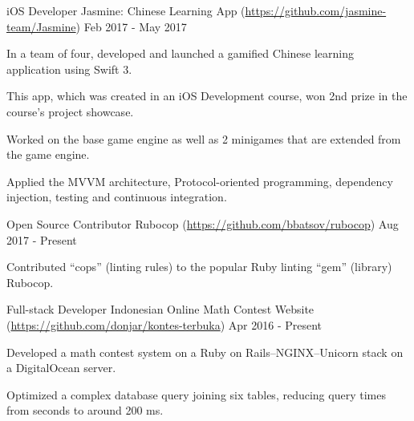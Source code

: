 

\begin{cventries}

  \cventry
  {iOS Developer} %
  {Jasmine: Chinese Learning App (\url{https://github.com/jasmine-team/Jasmine})} %
  {} %
  {Feb 2017 - May 2017} %
  {
    \begin{cvitems} %
    \item {In a team of four, developed and launched a gamified Chinese learning application using Swift 3.}
    \item {This app, which was created in an iOS Development course, won 2nd prize in the course's project showcase.}
    \item {Worked on the base game engine as well as 2 minigames that are extended from the game engine.}
    \item {Applied the MVVM architecture, Protocol-oriented programming, dependency injection, testing and continuous integration.}
    \end{cvitems}
  }

  \cventry
  {Open Source Contributor} %
  {Rubocop (\url{https://github.com/bbatsov/rubocop})} %
  {} %
  {Aug 2017 - Present} %
  {
    \begin{cvitems} %
    \item {Contributed ``cops'' (linting rules) to the popular Ruby linting ``gem'' (library) Rubocop.}
    \end{cvitems}
  }

  \cventry
  {Full-stack Developer} %
  {Indonesian Online Math Contest Website (\url{https://github.com/donjar/kontes-terbuka})} %
  {} %
  {Apr 2016 - Present} %
  {
    \begin{cvitems} %
    \item {Developed a math contest system on a Ruby on Rails--NGINX--Unicorn stack on a DigitalOcean server.}
    \item {Optimized a complex database query joining six tables, reducing query times from seconds to around 200 ms.}
    \end{cvitems}
  }

\end{cventries}
